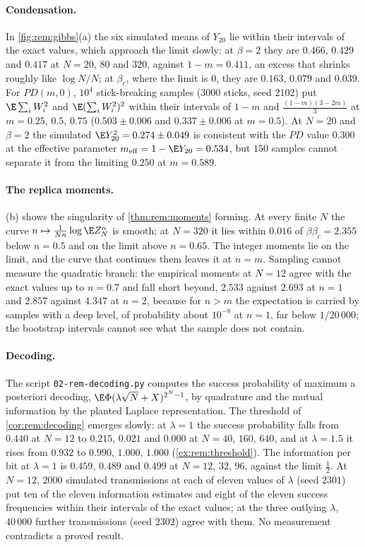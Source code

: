 \begin{refsection}
\paragraph{Condensation.} In \cref{fig:rem:gibbs}(a) the six simulated means of $Y_{20}$ lie within their intervals of the exact values, which approach the limit slowly: at $\beta=2$ they are $0.466$, $0.429$ and $0.417$ at $N=20$, $80$ and $320$, against $1-m=0.411$, an excess that shrinks roughly like $\log N/N$; at $\beta_c$, where the limit is $0$, they are $0.163$, $0.079$ and $0.039$. For $PD(m,0)$, $10^4$ stick-breaking samples ($3000$ sticks, seed $2102$) put $\E\sum_iW_i^2$ and $\E(\sum_iW_i^2)^2$ within their intervals of $1-m$ and $\frac{(1-m)(3-2m)}3$ at $m=0.25$, $0.5$, $0.75$ ($0.503\pm0.006$ and $0.337\pm0.006$ at $m=0.5$). At $N=20$ and $\beta=2$ the simulated $\E Y_{20}^2=0.274\pm0.049$ is consistent with the $PD$ value $0.300$ at the effective parameter $m_{\mathrm{eff}}=1-\E Y_{20}=0.534$, but $150$ samples cannot separate it from the limiting $0.250$ at $m=0.589$.

\paragraph{The replica moments.} (b) shows the singularity of \cref{thm:rem:moments} forming. At every finite $N$ the curve $n\mapsto\frac1{Nn}\log\E Z_N^n$ is smooth; at $N=320$ it lies within $0.016$ of $\beta\beta_c=2.355$ below $n=0.5$ and on the limit above $n=0.65$. The integer moments lie on the limit, and the curve that continues them leaves it at $n=m$. Sampling cannot measure the quadratic branch: the empirical moments at $N=12$ agree with the exact values up to $n=0.7$ and fall short beyond, $2.533$ against $2.693$ at $n=1$ and $2.857$ against $4.347$ at $n=2$, because for $n>m$ the expectation is carried by samples with a deep level, of probability about $10^{-8}$ at $n=1$, far below $1/20\,000$; the bootstrap intervals cannot see what the sample does not contain.

\paragraph{Decoding.} The script \texttt{02-rem-decoding.py} computes the success probability of maximum a posteriori decoding, $\E\Phi(\lambda\sqrt N+X)^{2^N-1}$, by quadrature and the mutual information by the planted Laplace representation. The threshold of \cref{cor:rem:decoding} emerges slowly: at $\lambda=1$ the success probability falls from $0.440$ at $N=12$ to $0.215$, $0.021$ and $0.000$ at $N=40$, $160$, $640$, and at $\lambda=1.5$ it rises from $0.932$ to $0.990$, $1.000$, $1.000$ (\cref{ex:rem:threshold}). The information per bit at $\lambda=1$ is $0.459$, $0.489$ and $0.499$ at $N=12$, $32$, $96$, against the limit $\frac12$. At $N=12$, $2000$ simulated transmissions at each of eleven values of $\lambda$ (seed $2301$) put ten of the eleven information estimates and eight of the eleven success frequencies within their intervals of the exact values; at the three outlying $\lambda$, $40\,000$ further transmissions (seed $2302$) agree with them. No measurement contradicts a proved result.


\end{refsection}
